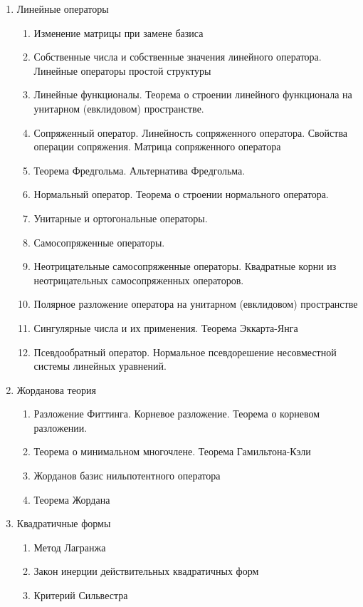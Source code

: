 \documentclass[a4paper]{article}
\begin{document}
\begin{enumerate}
\item Линейные операторы
\begin{enumerate}
\item Изменение матрицы при замене базиса
\item Собственные числа и собственные значения линейного оператора. Линейные операторы простой структуры
\item Линейные функционалы. Теорема о строении линейного функционала на унитарном (евклидовом) пространстве.
\item Сопряженный оператор. Линейность сопряженного оператора. Свойства операции сопряжения. Матрица сопряженного оператора
\item Теорема Фредгольма. Альтернатива Фредгольма.
\item Нормальный оператор. Теорема о строении нормального оператора.
\item Унитарные и ортогональные операторы.
\item Самосопряженные операторы.
\item Неотрицательные самосопряженные операторы. Квадратные корни из неотрицательных самосопряженных операторов.
\item Полярное разложение оператора на унитарном (евклидовом) пространстве
\item Сингулярные числа и их применения. Теорема Эккарта-Янга
\item Псевдообратный оператор. Нормальное псевдорешение несовместной системы линейных уравнений.
\end{enumerate}

\item Жорданова теория
\begin{enumerate}
\item Разложение Фиттинга. Корневое разложение. Теорема о корневом разложении.
\item Теорема о минимальном многочлене. Теорема Гамильтона-Кэли
\item Жорданов базис нильпотентного оператора
\item Теорема Жордана
\end{enumerate}

\item Квадратичные формы
\begin{enumerate}
\item Метод Лагранжа
\item Закон инерции действительных квадратичных форм
\item Критерий Сильвестра
\end{enumerate}


\end{enumerate}
\end{document}
